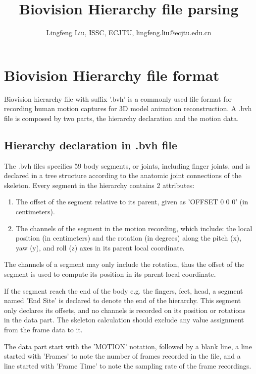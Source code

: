 \documentclass{report}
\begin{document}
\title{Biovision Hierarchy file parsing}
\author{Lingfeng Liu, ISSC, ECJTU, lingfeng.liu@ecjtu.edu.cn}

\maketitle

\section{Biovision Hierarchy file format}
Biovision hierarchy file with suffix '.bvh' is a commonly used file format for recording human motion captures for 3D model animation reconstruction. A .bvh file is composed by two parts, the hierarchy declaration and the motion data.

\subsection{Hierarchy declaration in .bvh file}
The .bvh files specifies 59 body segments, or joints, including finger joints, and is declared in a tree structure according to the anatomic joint connections of the skeleton. Every segment in the hierarchy contains 2 attributes:
\begin{enumerate}
\item The offset of the segment relative to its parent, given as 'OFFSET 0 0 0' (in centimeters).
\item The channels of the segment in the motion recording, which include: the local position (in centimeters) and the rotation (in degrees) along the pitch (x), yaw (y), and roll (z) axes in its parent local coordinate.
\end{enumerate}

The channels of a segment may only include the rotation, thus the offset of the segment is used to compute its position in its parent local coordinate.

If the segment reach the end of the body e.g. the fingers, feet, head, a segment named 'End Site' is declared to denote the end of the hierarchy. This segment only declares its offsets, and no channels is recorded on its position or rotations in the data part. The skeleton calculation should exclude any value assignment from the frame data to it.

The data part start with the 'MOTION' notation, followed by a blank line, a line started with 'Frames' to note the number of frames recorded in the file, and a line started with 'Frame Time' to note the sampling rate of the frame recordings.
\end{document}
